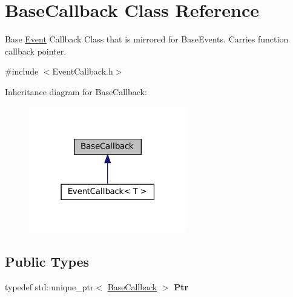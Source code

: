 \hypertarget{classBaseCallback}{}\section{Base\+Callback Class Reference}
\label{classBaseCallback}


Base \hyperlink{classEvent}{Event} Callback Class that is mirrored for Base\+Events. Carries function callback pointer.  




{\ttfamily \#include $<$Event\+Callback.\+h$>$}



Inheritance diagram for Base\+Callback\+:
\nopagebreak
\begin{figure}[H]
\begin{center}
\leavevmode
\includegraphics[width=195pt]{classBaseCallback__inherit__graph}
\end{center}
\end{figure}
\subsection*{Public Types}
\begin{DoxyCompactItemize}
\item 
\mbox{\label{classBaseCallback_a20c1623e166841cea02948e54122690a}} 
typedef std\+::unique\+\_\+ptr$<$ \hyperlink{classBaseCallback}{Base\+Callback} $>$ {\bfseries Ptr}
\end{DoxyCompactItemize}
